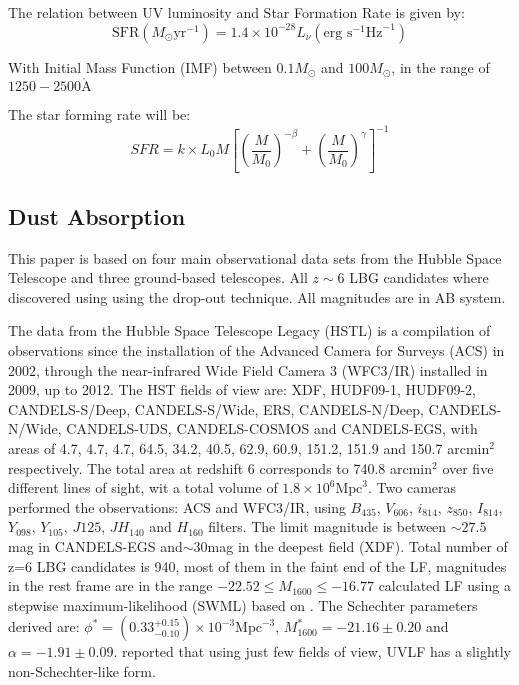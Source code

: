 \documentclass{emulateapj}
\begin{document}
The relation between UV luminosity and Star Formation Rate
\citep{madau98,kennicutt98} 
is given by:
\begin{equation}
 \textrm{SFR}\left(M_\odot \textrm{yr}^{-1}\right) 
      = 1.4 \times 10^{-28} L_{\nu} \left( \textrm{erg s}^{-1}\textrm{Hz}^{-1} 
	\right)
\end{equation}


  With Initial Mass Function (IMF) between $0.1 M_\odot$ 
 and $100 M_\odot$, in the range of $1250-2500 \mathring{\textrm{A}} $

The star forming rate will be:
  \begin{equation}
  SFR = k \times L_{0} M \left[ \left( \frac{M}{M_0}\right)^{-\beta} 
		   + \left( \frac{M}{M_0}\right)^{\gamma} 
               \right]^{-1}
  \end{equation}

\subsection{Dust Absorption}


This paper is based on four main observational data sets from the Hubble Space Telescope 
and three ground-based telescopes. All $z\sim 6$ LBG candidates where discovered using using 
the drop-out technique\citep{steidel03}. All magnitudes are in AB system.


The data from the Hubble Space Telescope Legacy (HSTL) \citep{bouwens14} is a compilation 
of observations since the installation of the Advanced Camera for Surveys (ACS) in 2002, 
through the near-infrared Wide Field Camera 3 (WFC3/IR) installed in 2009, up to 2012. 
The HST fields of view are: XDF, HUDF09-1, HUDF09-2, CANDELS-S/Deep, 
CANDELS-S/Wide, ERS, CANDELS-N/Deep, CANDELS-N/Wide, CANDELS-UDS, 
CANDELS-COSMOS and CANDELS-EGS, with areas of 4.7, 4.7, 4.7, 64.5, 34.2, 
40.5, 62.9, 60.9, 151.2, 151.9 and 150.7 arcmin$^2$ respectively. The total area 
at redshift 6 corresponds 
to 740.8 arcmin$^2$ over five different lines of sight, wit a total volume of 
$1.8 \times 10^6 \textrm{Mpc}^3$.
Two cameras performed the observations: ACS and WFC3/IR, using 
$B_{435}$, $V_{606}$, $ i_{814}$, $ z_{850}$, $ I_{814}$, $Y_{098}$, $Y_{105}$, $J{125}$, 
$JH_{140}$ and $H_{160}$ filters.
The limit magnitude is between $\sim27.5$mag in CANDELS-EGS and$\sim30 $mag in the 
deepest field (XDF). Total number of z=6 LBG candidates is 940, most of them in the faint 
end of the LF, magnitudes in the rest frame are in the range $-22.52\leq M_{1600} \leq -16.77$
\citet{bouwens14} calculated LF using a stepwise maximum-likelihood (SWML) based on \citet{efstathiou88}. 
The Schechter parameters derived are: 
$\phi^* =(0.33_{-0.10}^{+0.15}) \times 10 ^{-3}  \textrm{Mpc}^{-3} $, 
$M^*_{1600} = -21.16\pm 0.20$ and $\alpha = -1.91 \pm 0.09$. 
\citet{bouwens14} reported that using just few fields of view, UVLF has a slightly non-Schechter-like form. 
\end{document}

